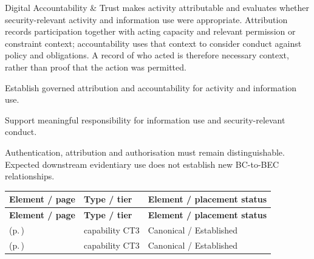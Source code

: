 Digital Accountability \& Trust makes activity attributable and evaluates whether security-relevant activity and information use were appropriate. Attribution records participation together with acting capacity and relevant permission or constraint context; accountability uses that context to consider conduct against policy and obligations. A record of who acted is therefore necessary context, rather than proof that the action was permitted.



Establish governed attribution and accountability for activity and information use.



Support meaningful responsibility for information use and security-relevant conduct.



Authentication, attribution and authorisation must remain distinguishable. Expected downstream evidentiary use does not establish new BC-to-BEC relationships.


\begingroup\small\setlength{\TableWidth}{\dimexpr\linewidth-6\tabcolsep-4\arrayrulewidth\relax}
\begin{longtable}{|>{\raggedright\arraybackslash}p{0.52\TableWidth}|>{\raggedright\arraybackslash}p{0.2\TableWidth}|>{\raggedright\arraybackslash}p{0.28\TableWidth}|}
\hline\rowcolor{TableHead}\textbf{Element / page} & \textbf{Type / tier} & \textbf{Element / placement status}\\\hline\endfirsthead
\hline\rowcolor{TableHead}\textbf{Element / page} & \textbf{Type / tier} & \textbf{Element / placement status}\\\hline\endhead
\hline\endfoot
\nameref{cap:bc-governed-activity-attribution} (p.\,\pageref{cap:bc-governed-activity-attribution}) & capability CT3 & Canonical / Established\\\hline
\nameref{cap:bc-security-information-use-accountability} (p.\,\pageref{cap:bc-security-information-use-accountability}) & capability CT3 & Canonical / Established\\\hline
\end{longtable}\endgroup

